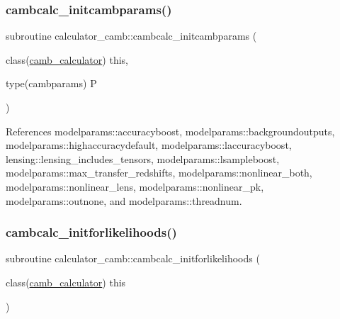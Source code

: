 \mbox{\label{namespacecalculator__camb_a1f498feeb9fd7b4b6ff5c951bb3bcf5d}} 
\subsubsection{\texorpdfstring{cambcalc\+\_\+initcambparams()}{cambcalc\_initcambparams()}}
{\footnotesize\ttfamily subroutine calculator\+\_\+camb\+::cambcalc\+\_\+initcambparams (\begin{DoxyParamCaption}\item[{class(\mbox{\hyperlink{structcalculator__camb_1_1camb__calculator}{camb\+\_\+calculator}})}]{this,  }\item[{type(cambparams)}]{P }\end{DoxyParamCaption})}



References modelparams\+::accuracyboost, modelparams\+::backgroundoutputs, modelparams\+::highaccuracydefault, modelparams\+::laccuracyboost, lensing\+::lensing\+\_\+includes\+\_\+tensors, modelparams\+::lsampleboost, modelparams\+::max\+\_\+transfer\+\_\+redshifts, modelparams\+::nonlinear\+\_\+both, modelparams\+::nonlinear\+\_\+lens, modelparams\+::nonlinear\+\_\+pk, modelparams\+::outnone, and modelparams\+::threadnum.

\mbox{\label{namespacecalculator__camb_a5eb19890ea9bf2acad52f23b9334e1e8}} 
\subsubsection{\texorpdfstring{cambcalc\+\_\+initforlikelihoods()}{cambcalc\_initforlikelihoods()}}
{\footnotesize\ttfamily subroutine calculator\+\_\+camb\+::cambcalc\+\_\+initforlikelihoods (\begin{DoxyParamCaption}\item[{class(\mbox{\hyperlink{structcalculator__camb_1_1camb__calculator}{camb\+\_\+calculator}})}]{this }\end{DoxyParamCaption})}

